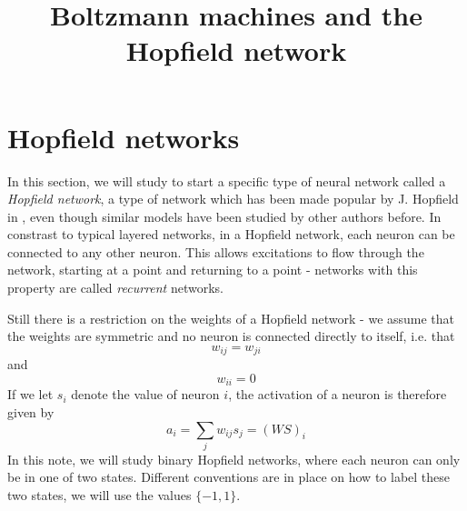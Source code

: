 \documentclass[a4paper, draft]{article}
\title{Boltzmann machines and the Hopfield network}
\theoremstyle{own}
\theoremstyle{remark}
\begin{document}
\maketitle




\section{Hopfield networks}

In this section, we will study to start a specific type of neural network called a {\em Hopfield network}, a type of network which has been made popular by J. Hopfield in \cite{Hopfield1982}, even though similar models have been studied by other authors before. In constrast to typical layered networks, in a Hopfield network, each neuron can be connected to any other neuron. This allows excitations to flow through the network, starting at a point and returning to a point - networks with this property are called {\em recurrent} networks.

Still there is a restriction on the weights of a Hopfield network - we assume that the weights are symmetric and no neuron is connected directly to itself, i.e. that
$$
w_{ij} = w_{ji} 
$$
and
$$
w_{ii} = 0
$$
If we let $s_i$ denote the value of neuron $i$, the activation of a neuron is therefore given by
$$
a_i = \sum_{j} w_{ij} s_j = (WS)_i
$$
In this note, we will study binary Hopfield networks, where each neuron can only be in one of two states. Different conventions are in place on how to label these two states, we will use the values $\{ -1, 1\}$. 
\end{document}
